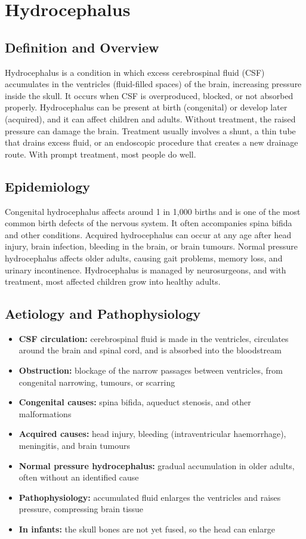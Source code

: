 \chapter{Hydrocephalus}

\section*{Definition and Overview}
Hydrocephalus is a condition in which excess cerebrospinal fluid (CSF) accumulates in the ventricles (fluid-filled spaces) of the brain, increasing pressure inside the skull. It occurs when CSF is overproduced, blocked, or not absorbed properly. Hydrocephalus can be present at birth (congenital) or develop later (acquired), and it can affect children and adults. Without treatment, the raised pressure can damage the brain. Treatment usually involves a shunt, a thin tube that drains excess fluid, or an endoscopic procedure that creates a new drainage route. With prompt treatment, most people do well.

\section*{Epidemiology}
Congenital hydrocephalus affects around 1 in 1,000 births and is one of the most common birth defects of the nervous system. It often accompanies spina bifida and other conditions. Acquired hydrocephalus can occur at any age after head injury, brain infection, bleeding in the brain, or brain tumours. Normal pressure hydrocephalus affects older adults, causing gait problems, memory loss, and urinary incontinence. Hydrocephalus is managed by neurosurgeons, and with treatment, most affected children grow into healthy adults.

\section*{Aetiology and Pathophysiology}
\begin{itemize}
    \item \textbf{CSF circulation:} cerebrospinal fluid is made in the ventricles, circulates around the brain and spinal cord, and is absorbed into the bloodstream
    \item \textbf{Obstruction:} blockage of the narrow passages between ventricles, from congenital narrowing, tumours, or scarring
    \item \textbf{Congenital causes:} spina bifida, aqueduct stenosis, and other malformations
    \item \textbf{Acquired causes:} head injury, bleeding (intraventricular haemorrhage), meningitis, and brain tumours
    \item \textbf{Normal pressure hydrocephalus:} gradual accumulation in older adults, often without an identified cause
    \item \textbf{Pathophysiology:} accumulated fluid enlarges the ventricles and raises pressure, compressing brain tissue
    \item \textbf{In infants:} the skull bones are not yet fused, so the head can enlarge
\end{itemize}

